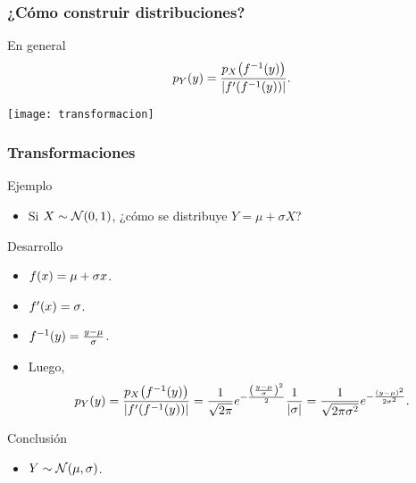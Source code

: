 \documentclass[table]{beamer}
\begin{document}
\begin{frame}
    \frametitle{¿Cómo construir distribuciones?}
    \begin{block}{En general}
        \begin{equation*}
            \ppdf{Y}{y} = \frac{\ppdf{X}{f^{-1} \parens{y}}}{\vparens{f' \parens{f^{-1} \parens{y}}}} .
        \end{equation*}
    \end{block}
    \begin{center}
        \texttt{[image: transformacion]}
    \end{center}
\end{frame}

\begin{frame}
    \frametitle{Transformaciones}
    \begin{exampleblock}{Ejemplo}
        \begin{itemize}
            \item Si $X \sim \normal{0}{1}$, ¿cómo se distribuye $Y = \mu + \sigma X$?
        \end{itemize}
    \end{exampleblock}
    \begin{block}{Desarrollo}
        \begin{itemize}
            \item $\ff{x} = \mu + \sigma x$.
            \item $f' \parens{x} = \sigma$.
            \item $f^{-1} \parens{y} = \frac{y - \mu}{\sigma}$.
            \item Luego,
                \begin{equation*}
                    \ppdf{Y}{y}
                    = \frac{\ppdf{X}{f^{-1} \parens{y}}}{\vparens{f' \parens{f^{-1} \parens{y}}}}
                    = \frac{1}{\sqrt{2 \pi}} e^{- \frac{\parens{\frac{y - \mu}{\sigma}}^{2}}{2}} \frac{1}{\vparens{\sigma}}
                    = \frac{1}{\sqrt{2 \pi \sigma^{2}}} e^{- \frac{\parens{y - \mu}^{2}}{2 \sigma^{2}}} .
                \end{equation*}
        \end{itemize}
    \end{block}
    \begin{block}{Conclusión}
        \begin{itemize}
            \item $Y \sim \normal{\mu}{\sigma}$.
        \end{itemize}
    \end{block}
\end{frame}
\end{document}
